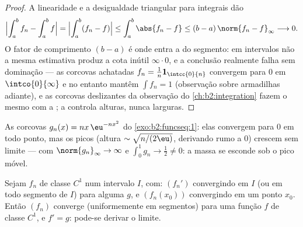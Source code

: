 \begin{proof}
A linearidade e a desigualdade triangular para integrais dão
\[
\Bigl|\int_a^b f_n - \int_a^b f\Bigr|
= \Bigl|\int_a^b (f_n - f)\Bigr|
\leq \int_a^b\abs{f_n - f}
\leq (b - a)\,\norm{f_n - f}_\infty \longrightarrow 0 .
\]
O fator de comprimento $(b - a)$ é onde entra a  do segmento:
em intervalos não  a mesma estimativa produz a
cota inútil $\infty\cdot0$, e a conclusão realmente
falha sem dominação --- as corcovas achatadas $f_n =
\frac1n\mathbf 1_{\intcc{0}{n}}$ convergem  para $0$ em
$\intco{0}{\infty}$ e no entanto mantêm $\int f_n = 1$ (observação sobre armadilhas
adiante), e as corcovas deslizantes da observação do
\cref{ch:b2:integration} fazem o mesmo com a ; a  controla alturas, nunca larguras.
\end{proof}

\begin{omfigure}

{\small As corcovas $g_n(x) = nx\,\eu^{-nx^2}$ do
\cref{exo:b2:funcseq:1}: elas convergem para $0$ em todo ponto,
mas os picos (altura $\sim\sqrt{n/(2\eu)}$, derivando rumo a
$0$) crescem sem limite ---  com
$\norm{g_n}_\infty \to \infty$ e $\int_0^1 g_n \to \frac12
\neq 0$: a massa se esconde sob o pico móvel.}
\end{omfigure}

\begin{theorem}[Derivação]\label{thm:b2:funcseq:differentiation}
Sejam $f_n$ de classe $C^1$ num intervalo $I$, com: $(f_n')$ convergindo
\emph{} em $I$ (ou em todo segmento de $I$) para alguma $g$,
e $(f_n(x_0))$ convergindo em um ponto $x_0$. Então $(f_n)$
converge (uniformemente em segmentos) para uma função $f$ de classe $C^1$, e $f'
= g$: pode-se derivar o limite.
\end{theorem}

